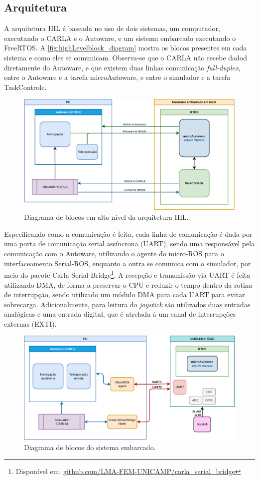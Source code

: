 \clearpage

\subsection{Arquitetura}

A arquitetura HIL é baseada no uso de dois sistemas, um computador, executando o CARLA e o Autoware, e um sistema embarcado executando o FreeRTOS. A \autoref{fig:highLevelblock_diagram} mostra os blocos presentes em cada sistema e como eles se comunicam. Observa-se que o CARLA não recebe dadod diretamente do Autoware, e que existem duas linhas comunicação \textit{full-duplex}, entre o Autoware e a tarefa microAutoware, e entre o simulador e a tarefa TaskControle.

\begin{figure}[H]
	\centering
	\includegraphics[width=0.7\linewidth]{img/highLevelblock_diagram.pdf}
	\caption{Diagrama de blocos em alto nível da arquitetura HIL.}
	\label{fig:highLevelblock_diagram}
\end{figure}

Especificando como a comunicação é feita, cada linha de comunicação é dada por uma porta de comunicação serial assíncrona (UART), sendo uma responsável pela comunicação com o Autoware, utilizando o agente do micro-ROS para o interfaceamento Serial-ROS, enquanto a outra se comunica com o simulador, por meio do pacote Carla-Serial-Bridge\footnote{Disponível em: \href{https://github.com/LMA-FEM-UNICAMP/carla_serial_bridge}{github.com/LMA-FEM-UNICAMP/carla\_serial\_bridge}}. A recepção e transmissão via UART é feita utilizando DMA, de forma a preservar o CPU e reduzir o tempo dentro da rotina de interrupção, sendo utilizado um módulo DMA para cada UART para evitar sobrecarga. Adicionalmente, para leitura do \textit{joystick} são utilizados duas entradas analógicas e uma entrada digital, que é atrelada à um canal de interrupções externas (EXTI).

\begin{figure}[H]
	\centering
	\includegraphics[width=0.7\linewidth]{img/block_diagram.pdf}
	\caption{Diagrama de blocos do sistema embarcado.}
	\label{fig:blockdiagram}
\end{figure}

